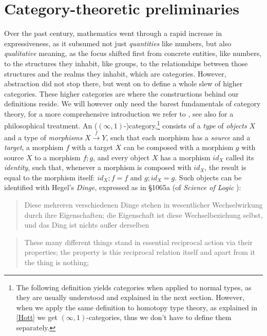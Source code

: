 \documentclass{article}
\begin{document}
\section{Category-theoretic preliminaries}
Over the past century, mathematics went through a rapid increase in expressiveness, as it subsumed not
just \emph{quantities} like numbers, but also \emph{qualitative} meaning, as the focus shifted first from
concrete entities, like numbers, to the structures they inhabit, like groups, to the relationships between
those structures and the realms they inhabit, which are categories. However, abstraction did not stop
there, but went on to define a whole slew of higher categories. These higher categories are where the
constructions behind our definitions reside. We will however only need the barest fundamentals of category
theory, for a more comprehensive introduction we refer to \cite{Lein}, see also \cite{CPhil} for a 
philosophical treatment. An ($(\infty, 1)$-)category,\footnote{The following definition yields categories
when applied to normal types, as they are usually understood and explained in the next section. However, when we apply
the same definition to homotopy type theory, as explained in \ref{Hott} we get $(\infty,1)$-categories,
thus we don't have to define them separately.} consists of a \emph{type} of \emph{objects} $X$ and a type
of \emph{morphisms} $X\xrightarrow{f} Y$, such that each morphism has a \emph{source} and a \emph{target},
a morphism $f$ with a target $X$ can be composed with a morphism $g$ with source $X$ to a morphism $f;g$,
and every object $X$ has a morphism $id_X$ called its \emph{identity}, such that, whenever a morphism
is composed with $id_X$, the result is equal to the morphism itself: $id_X;f=f$ and $g;id_X=g$. Such objects
can be identified with Hegel's \emph{Dinge}, expressed as in §1065a (of \emph{Science of Logic} \cite{Sol}):


\begin{quote}
    Diese mehreren verschiedenen Dinge stehen in wesentlicher Wechselwirkung durch ihre Eigenschaften;
die Eigenschaft ist diese Wechselbeziehung selbst, und das Ding ist nichts außer derselben
\end{quote}

\begin{quote}
    These many different things stand in essential reciprocal action via their properties; the property
is this reciprocal relation itself and apart from it the thing is nothing;
\end{quote}
\end{document}
